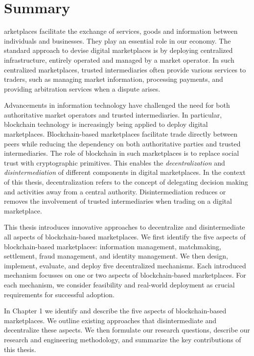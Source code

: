 \chapter*{Summary}

arketplaces facilitate the exchange of services, goods and information between individuals and businesses.
They play an essential role in our economy.
The standard approach to devise digital marketplaces is by deploying centralized infrastructure, entirely operated and managed by a market operator.
In such centralized marketplaces, trusted intermediaries often provide various services to traders, such as managing market information, processing payments, and providing arbitration services when a dispute arises.

Advancements in information technology have challenged the need for both authoritative market operators and trusted intermediaries.
In particular, blockchain technology is increasingly being applied to deploy digital marketplaces.
Blockchain-based marketplaces facilitate trade directly between peers while reducing the dependency on both authoritative parties and trusted intermediaries.
The role of blockchain in such marketplaces is to replace social trust with cryptographic primitives.
This enables the \emph{decentralization} and \emph{disintermediation} of different components in digital marketplaces.
In the context of this thesis, decentralization refers to the concept of delegating decision making and activities away from a central authority.
Disintermediation reduces or removes the involvement of trusted intermediaries when trading on a digital marketplace.

This thesis introduces innovative approaches to decentralize and disintermediate all aspects of blockchain-based marketplaces.
We first identify the five aspects of blockchain-based marketplaces: information management, matchmaking, settlement, fraud management, and identity management.
We then design, implement, evaluate, and deploy five decentralized mechanisms.
Each introduced mechanism focusses on one or two aspects of blockchain-based marketplaces.
For each mechanism, we consider feasibility and real-world deployment as crucial requirements for successful adoption.

In Chapter 1 we identify and describe the five aspects of blockchain-based marketplaces.
We outline existing approaches that disintermediate and decentralize these aspects.
We then formulate our research questions, describe our research and engineering methodology, and summarize the key contributions of this thesis.

